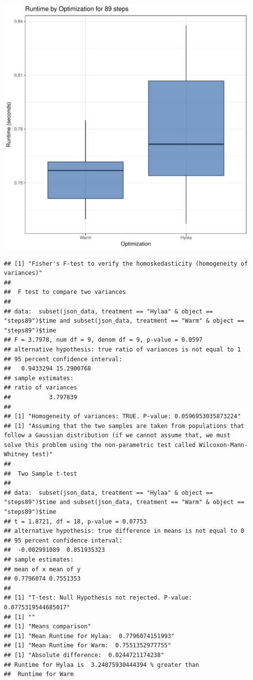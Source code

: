 \documentclass{article}\usepackage[]{graphicx}\usepackage[]{color}
\makeatletter
\def\maxwidth{ %
  \ifdim\Gin@nat@width>\linewidth
    \linewidth
  \else
    \Gin@nat@width
  \fi
}
\newenvironment{kframe}{%
 \def\at@end@of@kframe{}%
 \ifinner\ifhmode%
  \def\at@end@of@kframe{\end{minipage}}%
  \begin{minipage}{\columnwidth}%
 \fi\fi%
 \def\FrameCommand##1{\hskip\@totalleftmargin \hskip-\fboxsep
 \colorbox{shadecolor}{##1}\hskip-\fboxsep
     \hskip-\linewidth \hskip-\@totalleftmargin \hskip\columnwidth}%
 \MakeFramed {\advance\hsize-\width
   \@totalleftmargin\z@ \linewidth\hsize
   \@setminipage}}%
 {\par\unskip\endMakeFramed%
 \at@end@of@kframe}
\newenvironment{knitrout}{}{} %
\makeatother
\begin{document}
\begin{knitrout}
\color{fgcolor}
\includegraphics[width=\maxwidth]{figure/RH1_steps89-1} 
\begin{kframe}\begin{verbatim}
## [1] "Fisher's F-test to verify the homoskedasticity (homogeneity of variances)"
## 
## 	F test to compare two variances
## 
## data:  subset(json_data, treatment == "Hylaa" & object == "steps89")$time and subset(json_data, treatment == "Warm" & object == "steps89")$time
## F = 3.7978, num df = 9, denom df = 9, p-value = 0.0597
## alternative hypothesis: true ratio of variances is not equal to 1
## 95 percent confidence interval:
##   0.9433294 15.2900768
## sample estimates:
## ratio of variances 
##           3.797839 
## 
## [1] "Homogeneity of variances: TRUE. P-value: 0.0596953035873224"
## [1] "Assuming that the two samples are taken from populations that follow a Gaussian distribution (if we cannot assume that, we must solve this problem using the non-parametric test called Wilcoxon-Mann-Whitney test)"
## 
## 	Two Sample t-test
## 
## data:  subset(json_data, treatment == "Hylaa" & object == "steps89")$time and subset(json_data, treatment == "Warm" & object == "steps89")$time
## t = 1.8721, df = 18, p-value = 0.07753
## alternative hypothesis: true difference in means is not equal to 0
## 95 percent confidence interval:
##  -0.002991089  0.051935323
## sample estimates:
## mean of x mean of y 
## 0.7796074 0.7551353 
## 
## [1] "T-test: Null Hypothesis not rejected. P-value: 0.0775319544685017"
## [1] ""
## [1] "Means comparison"
## [1] "Mean Runtime for Hylaa:  0.7796074151993"
## [1] "Mean Runtime for Warm:  0.7551352977755"
## [1] "Absolute difference:  0.0244721174238"
## Runtime for Hylaa is  3.24075930444394 % greater than 
##  Runtime for Warm
\end{verbatim}
\end{kframe}
\end{knitrout}
\end{document}
